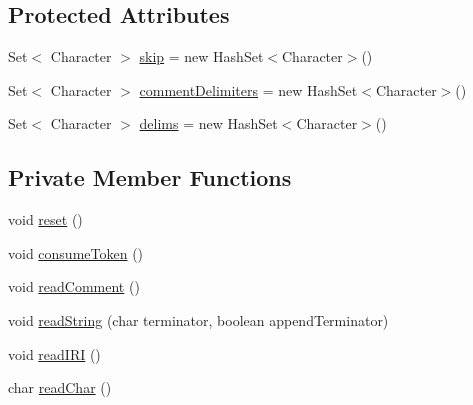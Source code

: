 \subsection*{Protected Attributes}
\begin{DoxyCompactItemize}
\item 
Set$<$ Character $>$ \hyperlink{classorg_1_1coode_1_1owlapi_1_1manchesterowlsyntax_1_1_manchester_o_w_l_syntax_tokenizer_aff48f95c9802938b89e1ee204f6749bb}{skip} = new Hash\-Set$<$Character$>$()
\item 
Set$<$ Character $>$ \hyperlink{classorg_1_1coode_1_1owlapi_1_1manchesterowlsyntax_1_1_manchester_o_w_l_syntax_tokenizer_ad10c765e426a9ff4b0e528839436b376}{comment\-Delimiters} = new Hash\-Set$<$Character$>$()
\item 
Set$<$ Character $>$ \hyperlink{classorg_1_1coode_1_1owlapi_1_1manchesterowlsyntax_1_1_manchester_o_w_l_syntax_tokenizer_a333411ab1441d3039a2559bfe09e4fa2}{delims} = new Hash\-Set$<$Character$>$()
\end{DoxyCompactItemize}
\subsection*{Private Member Functions}
\begin{DoxyCompactItemize}
\item 
void \hyperlink{classorg_1_1coode_1_1owlapi_1_1manchesterowlsyntax_1_1_manchester_o_w_l_syntax_tokenizer_a7e7f1d11f0dabd7b3f44e6447bfdb5a2}{reset} ()
\item 
void \hyperlink{classorg_1_1coode_1_1owlapi_1_1manchesterowlsyntax_1_1_manchester_o_w_l_syntax_tokenizer_ad0cbd0a9ab8e5a23b3b772583b9df7d5}{consume\-Token} ()
\item 
void \hyperlink{classorg_1_1coode_1_1owlapi_1_1manchesterowlsyntax_1_1_manchester_o_w_l_syntax_tokenizer_a91b0813030f26e7d9949ff13e1e3abca}{read\-Comment} ()
\item 
void \hyperlink{classorg_1_1coode_1_1owlapi_1_1manchesterowlsyntax_1_1_manchester_o_w_l_syntax_tokenizer_a99c7e904fec32943a415d9313161bc61}{read\-String} (char terminator, boolean append\-Terminator)
\item 
void \hyperlink{classorg_1_1coode_1_1owlapi_1_1manchesterowlsyntax_1_1_manchester_o_w_l_syntax_tokenizer_ae2e2e4a742100250d2fcb93c3f5dbdd0}{read\-I\-R\-I} ()
\item 
char \hyperlink{classorg_1_1coode_1_1owlapi_1_1manchesterowlsyntax_1_1_manchester_o_w_l_syntax_tokenizer_af7dd703cb12e3550354192745a4b49c6}{read\-Char} ()
\end{DoxyCompactItemize}
